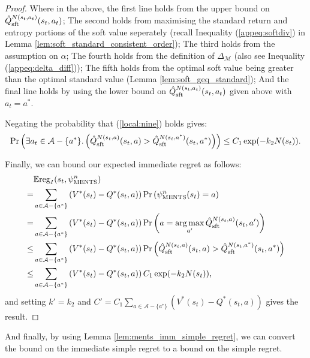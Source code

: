 \documentclass{article}
\newcommand{\bb}[1]{\mathbb{#1}}
\newcommand{\cl}[1]{\mathcal{#1}}
\newcommand{\Qst}[3]{\hat{Q}^{#3}_{\textnormal{sft}}(#1,#2)}
\newcommand{\reg}{\textnormal{reg}}
\DeclareMathOperator*{\argmax}{arg\,max}
\theoremstyle{plain}
\begin{document}
\begin{appendices}
\begin{proof}
            Where in the above, the first line holds from the upper bound on $\Qst{s_t}{a_t}{N(s_t,a_t)}$; The second holds from maximising the standard return and entropy portions of the soft value seperately (recall Inequality (\ref{appeq:softdiv}) in Lemma \ref{lem:soft_standard_consistent_order}); The third holds from the assumption on $\alpha$; The fourth holds from the definition of $\Delta_{\cl{M}}$ (also see Inequality (\ref{appeq:delta_diff})); The fifth holds from the optimal soft value being greater than the optimal standard value (Lemma \ref{lem:soft_geq_standard}); And the final line holds by using the lower bound on $\Qst{s_t}{a_t}{N(s_t,a_t)}$ given above with $a_t=a^*$. 
            
            Negating the probability that (\ref{local:nine}) holds gives:
            \begin{align}
                \Pr\left(\exists a_t\in\cl{A}-\{a^*\}.\left( \Qst{s_t}{a}{N(s_t,a)} > \Qst{s_t}{a^*}{N(s_t,a^*)}\right)\right)
                    \leq C_1 \exp(-k_2N(s_t)).
            \end{align}
            
            Finally, we can bound our expected immediate regret as follows:
            \begin{align}
                & \bb{E}\reg_I(s_t,\psi^n_{\text{MENTS}})  \\
                    =& \sum_{a\in\cl{A}-\{a^*\}} 
                        \left(V^*(s_t)-Q^*(s_t,a)\right) \Pr\left(\psi^n_{\text{MENTS}}(s_t) =a \right) \\
                    =& \sum_{a\in\cl{A}-\{a^*\}} 
                        \left(V^*(s_t)-Q^*(s_t,a)\right) \Pr\left(a = \argmax_{a'} \Qst{s_t}{a'}{N(s_t,a)} \right) \\
                    \leq& \sum_{a\in\cl{A}-\{a^*\}} 
                        \left(V^*(s_t)-Q^*(s_t,a)\right) \Pr\left(\Qst{s_t}{a}{N(s_t,a)} > \Qst{s_t}{a^*}{N(s_t,a^*)}  \right) \\
                    \leq&  \sum_{a\in\cl{A}-\{a^*\}} 
                        \left(V^*(s_t)-Q^*(s_t,a)\right) C_1 \exp(-k_2N(s_t)),
            \end{align}
            and setting $k'=k_2$ and $C'=C_1\sum_{a\in\cl{A}-\{a^*\}} \left(V^*(s_t)-Q^*(s_t,a)\right)$ gives the result.
        \end{proof}






    
        And finally, by using Lemma \ref{lem:ments_imm_simple_regret}, we can convert the bound on the immediate simple regret to a bound on the simple regret.
        

\end{appendices}
\end{document}
